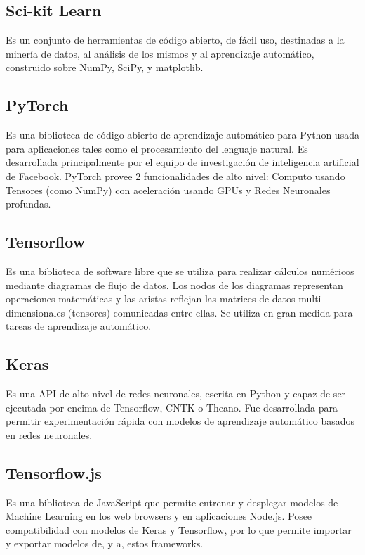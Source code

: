 \documentclass[
11pt, %
oneside, %
spanish, %
singlespacing, %
headsepline, %
chapterinoneline, %
]{MastersDoctoralThesis} %
\begin{document}
\subsection{Sci-kit Learn \cite{sk}}
Es un conjunto de herramientas de código abierto, de fácil uso, destinadas a la minería de datos, al análisis de los mismos y al aprendizaje automático, construido sobre NumPy, SciPy, y matplotlib.

\subsection{PyTorch \cite{pyt}}
Es una biblioteca de código abierto de aprendizaje automático para Python usada para aplicaciones tales como el procesamiento del lenguaje natural. Es desarrollada principalmente por el equipo de investigación de inteligencia artificial de Facebook. PyTorch provee 2 funcionalidades de alto nivel: Computo usando Tensores (como NumPy) con aceleración usando GPUs y Redes Neuronales profundas.

\subsection{Tensorflow \cite{tf}}
Es una biblioteca de software libre que se utiliza para realizar cálculos numéricos mediante diagramas de flujo de datos. Los nodos de los diagramas representan operaciones matemáticas y las aristas reflejan las matrices de datos multi dimensionales (tensores) comunicadas entre ellas. Se utiliza en gran medida para tareas de aprendizaje automático.

\subsection{Keras \cite{ks}}
Es una API de alto nivel de redes neuronales, escrita en Python y capaz de ser ejecutada por encima de Tensorflow, CNTK o Theano. Fue desarrollada para permitir experimentación rápida con modelos de aprendizaje automático basados en redes neuronales.

\subsection{Tensorflow.js \cite{tfjs}}
Es una biblioteca de JavaScript que permite entrenar y desplegar modelos de Machine Learning en los web browsers y en aplicaciones Node.js. Posee compatibilidad con modelos de Keras y Tensorflow, por lo que permite importar y exportar modelos de, y a, estos frameworks.
\end{document}
